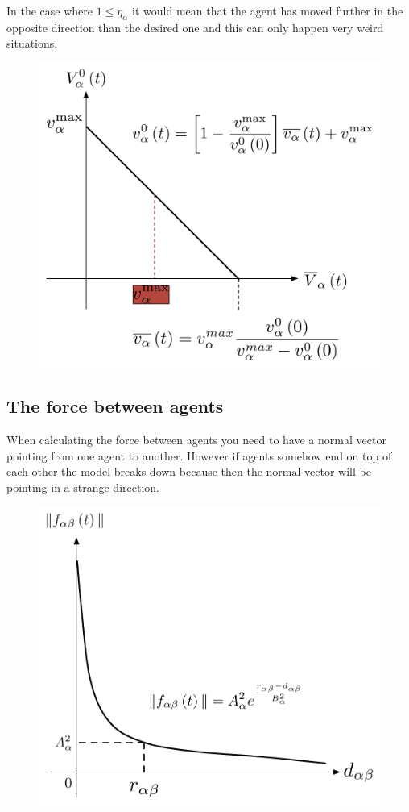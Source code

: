 In the case where $1 \leq \eta_{\alpha}$ it would mean that the agent has moved 
further in the opposite direction than the desired one and this can only happen very 
weird situations.

\begin{figure}
\centering
{\includegraphics[scale=0.45]{impatience.pdf}} 
\caption{\small{}\label{impatience}}
\end{figure}

\subsection{The force between agents}
When calculating the force between agents you need to have a normal vector 
pointing from one agent to another. However if agents somehow end on top of 
each other the model breaks down because then the normal vector will be pointing 
in a strange direction.

\begin{figure}
\centering
{\includegraphics[scale=0.45]{physicalinteraction.pdf}} 
\caption{\small{}\label{physicalinteraction}}
\end{figure}